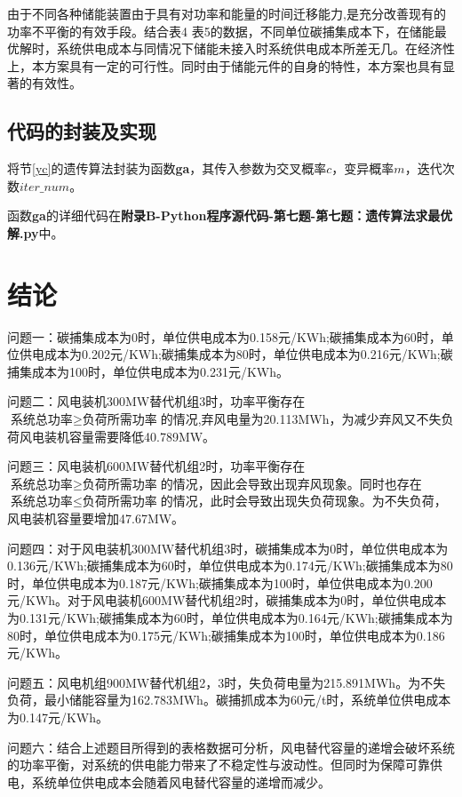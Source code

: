 \documentclass{cumcmthesis}
\begin{document}
由于不同各种储能装置由于具有对功率和能量的时间迁移能力,是充分改善现有的功率不平衡的有效手段。结合表4 表5的数据，不同单位碳捕集成本下，在储能最优解时，系统供电成本与同情况下储能未接入时系统供电成本所差无几。在经济性上，本方案具有一定的可行性。同时由于储能元件的自身的特性，本方案也具有显著的有效性。

	\subsection{代码的封装及实现}
	将节\ref{yc}的遗传算法封装为函数\textbf{ga}，其传入参数为交叉概率$ c $，变异概率$ m $，迭代次数$ iter\_num $。
	
	函数\textbf{ga}的详细代码在\textbf{附录B-Python程序源代码-第七题-第七题：遗传算法求最优解.py}中。
	
	
	 \newpage
	\section{结论}
	问题一：碳捕集成本为0时，单位供电成本为0.158元/KWh;碳捕集成本为60时，单位供电成本为0.202元/KWh;碳捕集成本为80时，单位供电成本为0.216元/KWh;碳捕集成本为100时，单位供电成本为0.231元/KWh。
	
	问题二：风电装机300MW替代机组3时，功率平衡存在$ \texttt{系统总功率}\geq \texttt{负荷所需功率}$的情况,弃风电量为20.113MWh，为减少弃风又不失负荷风电装机容量需要降低40.789MW。
	
	问题三：风电装机600MW替代机组2时，功率平衡存在$ \texttt{系统总功率}\geq \texttt{负荷所需功率}$的情况，因此会导致出现弃风现象。同时也存在$ \texttt{系统总功率}\leq \texttt{负荷所需功率}$的情况，此时会导致出现失负荷现象。为不失负荷，风电装机容量要增加47.67MW。
	
	问题四：对于风电装机300MW替代机组3时，碳捕集成本为0时，单位供电成本为0.136元/KWh;碳捕集成本为60时，单位供电成本为0.174元/KWh;碳捕集成本为80时，单位供电成本为0.187元/KWh;碳捕集成本为100时，单位供电成本为0.200元/KWh。对于风电装机600MW替代机组2时，碳捕集成本为0时，单位供电成本为0.131元/KWh;碳捕集成本为60时，单位供电成本为0.164元/KWh;碳捕集成本为80时，单位供电成本为0.175元/KWh;碳捕集成本为100时，单位供电成本为0.186元/KWh。
	
	问题五：风电机组900MW替代机组2，3时，失负荷电量为215.891MWh。为不失负荷，最小储能容量为162.783MWh。碳捕抓成本为60元/t时，系统单位供电成本为0.147元/KWh。
	
	问题六：结合上述题目所得到的表格数据可分析，风电替代容量的递增会破坏系统的功率平衡，对系统的供电能力带来了不稳定性与波动性。但同时为保障可靠供电，系统单位供电成本会随着风电替代容量的递增而减少。
	
\end{document}
